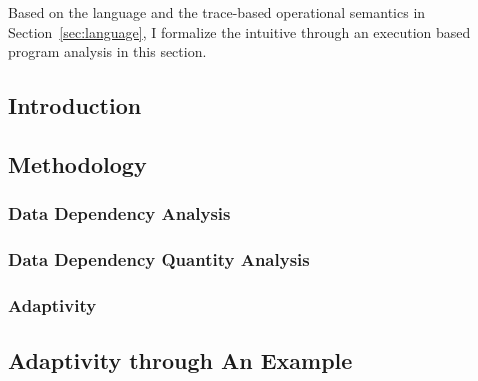 
Based on the language and the trace-based operational semantics in Section~\ref{sec:language},
I formalize the intuitive through an execution based program analysis in this section.

\subsection{Introduction}
\label{subsec:dynamic-intro}


\subsection{Methodology}
\label{subsec:dynamic-methodology}

\subsubsection{Data Dependency Analysis}
\label{subsubsec:dynamic-datadep}

\subsubsection{Data Dependency Quantity Analysis}
\label{subsubsec:dynamic-reachability}
%
\subsubsection{Adaptivity}
\label{subsubsec:dynamic-adapt}
%
%
\subsection{Adaptivity through An Example}
\label{subsec:dynamic-examples}

%

% 
%
%